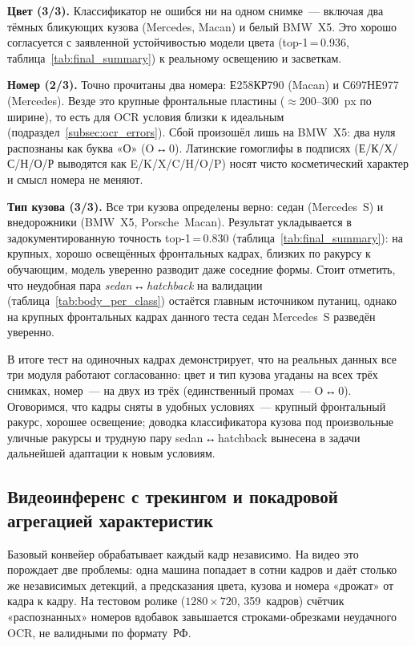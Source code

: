 \documentclass[10pt,a4paper]{report}
\numberwithin{equation}{chapter}
\numberwithin{figure}{chapter}
\numberwithin{table}{chapter}
\begin{document}
\textbf{Цвет (3/3).} Классификатор не ошибся ни на одном снимке~---
включая два тёмных бликующих кузова (Mercedes, Macan) и белый
BMW~X5. Это хорошо согласуется с заявленной
устойчивостью модели цвета (top-1\,=\,0.936,
таблица~\ref{tab:final_summary}) к реальному освещению и засветкам.

\textbf{Номер (2/3).} Точно прочитаны два номера:
Е258КР790 (Macan) и С697НЕ977 (Mercedes). Везде это
крупные фронтальные пластины ($\approx$200--300~px по ширине), то есть
для OCR условия близки к идеальным
(подраздел~\ref{subsec:ocr_errors}). Сбой произошёл лишь на BMW~X5: два
нуля распознаны как буква «О» (O\,↔\,0). Латинские гомоглифы в подписях
(Е/К/Х/С/Н/О/Р выводятся как E/K/X/C/H/O/P) носят чисто косметический
характер и смысл номера не меняют.

\textbf{Тип кузова (3/3).} Все три кузова определены верно: седан
(Mercedes~S) и внедорожники (BMW~X5, Porsche~Macan). Результат
укладывается в задокументированную
точность top-1\,=\,0.830 (таблица~\ref{tab:final_summary}): на крупных,
хорошо освещённых фронтальных кадрах, близких по ракурсу к обучающим,
модель уверенно разводит даже соседние формы. Стоит отметить, что
неудобная пара \emph{sedan\,↔\,hatchback} на валидации
(таблица~\ref{tab:body_per_class}) остаётся главным источником
путаниц, однако на крупных фронтальных кадрах данного теста седан
Mercedes~S разведён уверенно.

В итоге тест на одиночных кадрах демонстрирует, что на реальных данных
все три модуля работают согласованно: цвет и тип кузова угаданы на всех
трёх снимках, номер~--- на двух из трёх (единственный промах~--- O\,↔\,0). Оговоримся, что
кадры сняты в удобных условиях~--- крупный фронтальный ракурс, хорошее
освещение; доводка классификатора кузова под произвольные уличные
ракурсы и трудную пару sedan\,↔\,hatchback вынесена в задачи дальнейшей
адаптации к новым условиям.

\subsection{Видеоинференс с трекингом и покадровой агрегацией характеристик}
\label{subsec:video_tracking}

Базовый конвейер обрабатывает каждый кадр независимо. На видео это
порождает две проблемы: одна машина попадает в сотни кадров и даёт
столько же независимых детекций, а предсказания цвета, кузова и номера
«дрожат» от кадра к кадру. На тестовом ролике ($1280\times720$,
359~кадров) счётчик «распознанных» номеров вдобавок завышается
строками-обрезками неудачного OCR, не валидными по формату~РФ.
\end{document}
